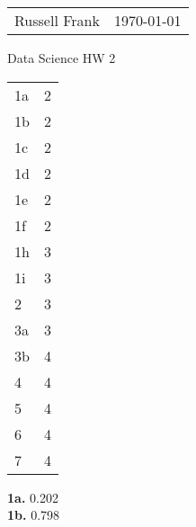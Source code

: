 \documentclass[10pt]{amsart}
\makeatletter
\newcommand{\head}[1]{
   \begin{tabular*}{7.1in}{@{}l@{\extracolsep{\fill}}r}
      Russell Frank & \today \\
   \end{tabular*}
   \begin{center} \LARGE #1 \normalsize \end{center}
   \vskip 0.1in
}
\makeatother
\begin{document}
\head{Data Science HW 2}

\begin{center}

\begin{tabular}{l|l}
  1a & 2 \\
  1b & 2 \\
  1c & 2 \\
  1d & 2 \\
  1e & 2 \\
  1f & 2 \\
  1h & 3 \\
  1i & 3 \\
  2 & 3 \\
  3a & 3 \\
  3b & 4 \\
  4 & 4 \\
  5 & 4 \\
  6 & 4 \\
  7 & 4 \\
\end{tabular}

\end{center}

\newpage

\textbf{1a.} 0.202 \\

\textbf{1b.} 0.798 \\
\end{document}
